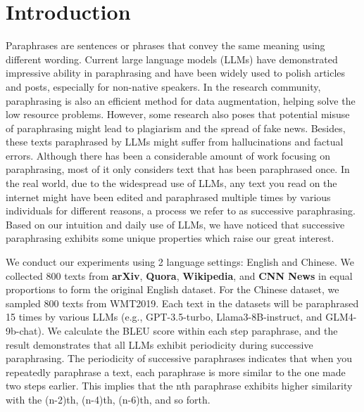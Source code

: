 
\section{Introduction}

Paraphrases are sentences or phrases that convey the same meaning using different wording\citep{bhagat2013what}. 
Current large language models (LLMs) have demonstrated impressive ability in paraphrasing and have been widely used to polish articles and posts, especially for non-native speakers. 
In the research community, paraphrasing is also an efficient method for data augmentation\cite{}, helping solve the low resource problems\cite{}. 
However, some research also poses that potential misuse of paraphrasing might lead to plagiarism and the spread of fake news. 
Besides, these texts paraphrased by LLMs might suffer from hallucinations\cite{} and factual errors\cite{}.
Although there has been a considerable amount of work focusing on paraphrasing, most of it only considers text that has been paraphrased once.
In the real world, due to the widespread use of LLMs, any text you read on the internet might have been edited and paraphrased multiple times by various individuals for different reasons, a process we refer to as successive paraphrasing.
Based on our intuition and daily use of LLMs, we have noticed that successive paraphrasing exhibits some unique properties which raise our great interest.



We conduct our experiments using 2 language settings: English and Chinese. 
We collected 800 texts from \textbf{arXiv}, \textbf{Quora}, \textbf{Wikipedia}, and \textbf{CNN News} in equal proportions to form the original English dataset.
For the Chinese dataset, we sampled 800 texts from WMT2019\cite{}.
Each text in the datasets will be paraphrased 15 times by various LLMs (e.g., GPT-3.5-turbo, Llama3-8B-instruct, and GLM4-9b-chat). 
We calculate the BLEU score within each step paraphrase, and the result demonstrates that all LLMs exhibit periodicity during successive paraphrasing. 
The periodicity of successive paraphrases indicates that when you repeatedly paraphrase a text, each paraphrase is more similar to the one made two steps earlier. 
This implies that the nth paraphrase exhibits higher similarity with the (n-2)th, (n-4)th, (n-6)th, and so forth.



